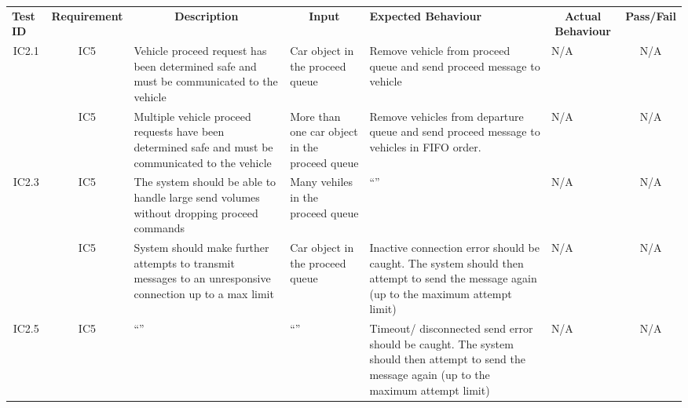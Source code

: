 \documentclass [10pt]{article}
\begin{document}
    
 \begin{longtable}{ | p{ } | p{ } |  p{ } |  p{ } | p{ } | p{ } |  p{ } |}  \hline

    \rowcolor{subsectionC}\textbf{Test ID}
    & \multicolumn{1}{c|}{\textbf{Requirement} }
    &\multicolumn{1}{c|}{\textbf{Description} }
    & \multicolumn{1}{c|}{\textbf{Input} }
    & \textbf{Expected Behaviour} 
    & \multicolumn{1}{c|}{\textbf{Actual Behaviour} }
    & \multicolumn{1}{c|}{\textbf{Pass/Fail}} \\  
    
   
    \multicolumn{1}{|c|}{IC2.1} 
    & \multicolumn{1}{c|}{IC5}
    & Vehicle proceed request has been determined safe and must be communicated to the vehicle
    & Car object in the proceed queue
    & Remove vehicle from proceed queue and send proceed message to vehicle 
    & N/A
    & \multicolumn{1}{|c|}{N/A}\\ 
    
  
    \rowcolor{tableCell}\multicolumn{1}{|c|}{IC2.2} 
    & \multicolumn{1}{c|}{IC5}
    & Multiple vehicle proceed requests have been determined safe and must be communicated to the vehicle
    & More than one car object in the proceed queue
    & Remove vehicles from departure queue and send proceed message to vehicles in FIFO order.  
    & N/A
    & \multicolumn{1}{|c|}{N/A}\\ 
    
    
    \multicolumn{1}{|c|}{IC2.3} 
    & \multicolumn{1}{c|}{IC5}
    & The system should be able to handle large send volumes without dropping proceed commands
    & Many vehiles in the proceed queue
    & ``''
    & N/A
    & \multicolumn{1}{|c|}{N/A}\\ \hline
    
    \pagebreak \hline
   
    \rowcolor{tableCell}\multicolumn{1}{|c|}{IC2.4} 
    & \multicolumn{1}{c|}{IC5}
    & System should make further attempts to transmit messages to an unresponsive connection  up to a max limit 
    & Car object in the proceed queue
    & Inactive connection error should be caught. The system should then attempt to send the message again (up to the maximum attempt limit)
    & N/A
    & \multicolumn{1}{|c|}{N/A}\\  
    
    
   
    
    \multicolumn{1}{|c|}{IC2.5} 
    & \multicolumn{1}{c|}{IC5}
    & ``''
    & ``'' 
    &  Timeout/ disconnected send error should be caught.  The system should then attempt to send the message again (up to the maximum attempt limit)
    & N/A
    & \multicolumn{1}{|c|}{N/A}\\ \hline

     
    \end{longtable}
    
\end{document}
